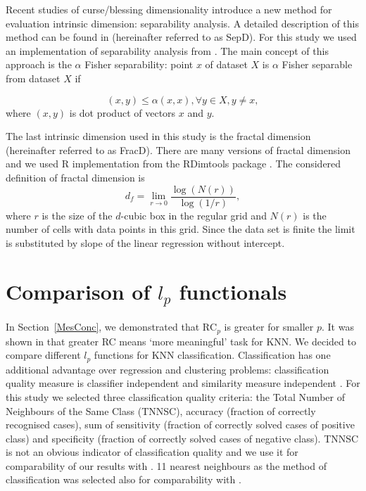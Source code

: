 \documentclass[entropy,article,submit,moreauthors,pdftex]{Definitions/mdpi}
\begin{document}
Recent studies of curse/blessing dimensionality introduce a new method for evaluation intrinsic dimension: separability analysis. A detailed description of this method can be found in \cite{gorban2018correction, albergante2019estimating} (hereinafter referred to as SepD). For this study we used an implementation of separability analysis from \cite{matlabZin}. The main concept of this approach is the $\alpha$ Fisher separability: point $x$ of dataset $X$ is $\alpha$ Fisher separable from dataset $X$ if

\begin{equation}\label{eq.Sep}
(x,y)\le\alpha (x,x), \forall y\in X, y\ne x,
\end{equation}
where $(x,y)$ is dot product of vectors $x$ and $y$.

The last intrinsic dimension used in this study is the fractal dimension (hereinafter referred to as FracD). There are many versions of fractal dimension and we used R implementation from the RDimtools package \cite{RDimtools}. The considered definition of fractal dimension is
$$d_f=\lim_{r\to 0}\frac{\log(N(r))}{\log(1/r)},$$
where $r$ is the size of the $d$-cubic box in the regular grid and $N(r)$ is the number of cells with data points in this grid. Since the data set is finite the limit is substituted by slope of the linear regression without intercept.


\section{Comparison of $l_p$ functionals}\label{compar}

In Section~\ref{MesConc}, we demonstrated  that $\text{RC}_p$ is greater for smaller  $p$. It was shown in \cite{beyer1999} that greater RC means `more meaningful' task for KNN. We decided to compare different $l_p$ functions for KNN classification. Classification has one additional advantage over regression and clustering problems: classification quality measure is classifier independent and similarity measure independent \cite{sammut2011}.
For this study we selected three classification quality criteria: the Total Number of Neighbours of the Same Class (TNNSC), accuracy (fraction of correctly recognised cases), sum of sensitivity (fraction of correctly solved cases of positive class) and specificity (fraction of correctly solved cases of negative class). TNNSC is not an obvious indicator of classification quality and we use it for comparability of our results with \cite{aggarwal2001}. 11 nearest neighbours as the method of classification was selected also for comparability with \cite{aggarwal2001}.
\end{document}
